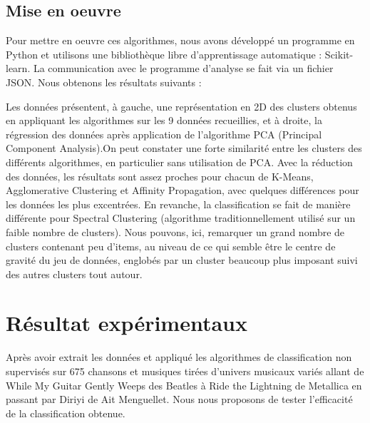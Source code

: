 \documentclass[soumission]{ir}
\begin{document}
\subsection{Mise en oeuvre}
Pour mettre en oeuvre ces algorithmes, nous avons développé un programme en Python et utilisons une bibliothèque 
libre d’apprentissage automatique : Scikit-learn. La communication avec le programme d’analyse se fait via un 
fichier JSON. Nous obtenons les résultats suivants :

\begin{figure}
    \caption{}
\end{figure}

\begin{figure}
    \caption{}
\end{figure}

\begin{figure}
    \caption{}
\end{figure}

\begin{figure}
    \caption{}
\end{figure}

Les données présentent, à gauche, une représentation en 2D des clusters obtenus en appliquant les algorithmes 
sur les 9 données recueillies, et à droite, la régression des données après application de l’algorithme PCA 
(Principal Component Analysis).On peut constater une forte similarité entre les clusters des différents 
algorithmes, en particulier sans utilisation de PCA. Avec la réduction des données, les résultats sont assez 
proches pour chacun de K-Means, Agglomerative Clustering et Affinity Propagation, avec quelques différences pour
 les données les plus excentrées. En revanche, la classification se fait de manière différente pour Spectral 
 Clustering (algorithme traditionnellement utilisé sur un faible nombre de clusters). Nous pouvons, ici, 
 remarquer un grand nombre de clusters contenant peu d’items, au niveau de ce qui semble être le centre de 
 gravité du jeu de données, englobés par un cluster beaucoup plus imposant suivi des autres clusters tout autour.

\section{Résultat expérimentaux}
Après avoir extrait les données et appliqué les algorithmes de classification non supervisés sur 675 chansons et musiques tirées 
d’univers musicaux variés allant de While My Guitar Gently Weeps des Beatles à Ride the Lightning de Metallica 
en passant par Diriyi de Ait Menguellet. Nous nous proposons de tester l’efficacité de la classification obtenue.
\end{document}
